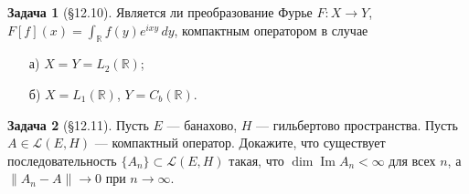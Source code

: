 \documentclass{article}
\theoremstyle{definition}
\newtheorem{problem}{Задача}
\newcommand{\R}{\mathbb R}
\begin{document}
\begin{problem}[\S 12.10]
Является ли преобразование Фурье $F\colon X\to Y$, $F[f](x) = \int_\R f(y) e^{ixy} \, dy$,
компактным оператором в случае
\begin{enumerate}
\item[а)] $X=Y=L_2(\R)$;
\item[б)] $X=L_1(\R)$, $Y=C_b(\R)$.
\end{enumerate}
\end{problem}

\begin{problem}[\S 12.11]
Пусть $E$ --- банахово, $H$ --- гильбертово пространства.
Пусть $A\in \mathcal L(E,H)$ --- компактный оператор.
Докажите, что существует последовательность $\{A_n\}\subset \mathcal L(E,H)$
такая, что $\dim \mathop{\mathrm{Im}} A_n < \infty$ для всех $n$,
а $\|A_n - A\| \to 0$ при $n\to \infty$.
\end{problem}
\end{document}
